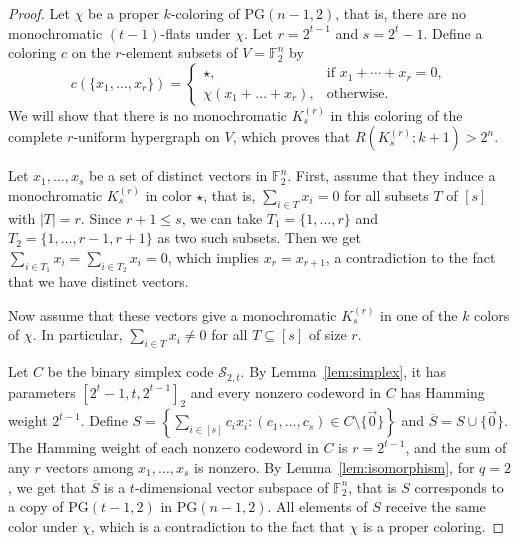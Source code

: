 \documentclass[10pt,a4paper]{amsart}
\begin{document}
\begin{proof}
    Let $\chi$ be a proper $k$-coloring of $\mathrm{PG}(n - 1, 2)$, that is, there are no monochromatic $(t - 1)$-flats under $\chi$. 
    Let $r = 2^{t - 1}$ and $s = 2^t - 1$.
    Define a coloring $c$ on the $r$-element subsets of $V = \mathbb{F}_2^n$ by 
    \begin{equation*}
        c(\{x_1, \dots, x_r\}) = 
        \begin{cases}
            \star, & \text{if } x_1 + \cdots + x_r = 0, \\
            \chi(x_1+ \dots+ x_r), & \text{otherwise.}
        \end{cases}
    \end{equation*}
    We will show that there is no monochromatic $K_s^{(r)}$ in this coloring of the complete $r$-uniform hypergraph on $V$, which proves that $R(K_s^{(r)}; k+1) > 2^n.$
   
    Let $x_1, \dots, x_s$ be a set of distinct vectors in $\mathbb{F}_2^n$.
    First, assume that they induce a monochromatic $K_s^{(r)}$ in color $\star$, that is, 
    $\sum_{i \in T} x_i = 0$ for all subsets $T$ of $[s]$ with $|T| = r$. 
    Since $r+1 \leq s$, we can take $T_1 = \{1, \dots, r\}$ and $T_2 = \{1, \dots, r - 1, r+1\}$ as two such subsets. 
    Then we get $\sum_{i \in T_1} x_i = \sum_{i \in T_2} x_i = 0$, which implies $x_r = x_{r + 1}$, a contradiction to the fact that we have distinct vectors. 

    Now assume that these vectors give a monochromatic $K_s^{(r)}$ in one of the $k$ colors of $\chi$. 
    In particular, $\sum_{i \in T} x_i \neq 0$ for all $T \subseteq [s]$ of size $r$. 
     
    Let $C$ be the binary simplex code $\mathcal{S}_{2,t}$.
    By Lemma~\ref{lem:simplex}, it has parameters $[2^{t} - 1, t, 2^{t-1}]_2$ and every nonzero codeword in $C$ has Hamming weight $2^{t - 1}$.
    Define $S = \left\{\sum_{i \in [s]}c_i x_i : (c_1, \dots, c_s) \in C \setminus \{\vec{0}\}\right\}$ and $\overline{S} = S \cup \{\vec{0}\}$. 
    The Hamming weight of each nonzero codeword in $C$ is $r = 2^{t - 1}$, and the sum of any $r$ vectors among $x_1, \dots, x_s$ is nonzero.
    By Lemma~\ref{lem:isomorphism}, for $q = 2$, we get that $\overline{S}$ is a $t$-dimensional vector subspace of $\mathbb{F}_2^n$, that is $S$ corresponds to a copy of $\mathrm{PG}(t - 1, 2)$ in $\mathrm{PG}(n - 1, 2)$.
    All elements of $S$ receive the same color under $\chi$, which is a contradiction to the fact that $\chi$ is a proper coloring. 
\end{proof}
\end{document}
